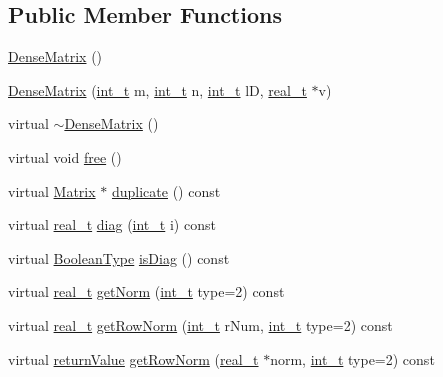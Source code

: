 \subsection*{Public Member Functions}
\begin{DoxyCompactItemize}
\item 
\hyperlink{class_dense_matrix_a962f1cca43a07753de96c8b9e413db06}{Dense\+Matrix} ()
\item 
\hyperlink{class_dense_matrix_ac3f86ff10526b05dc36e508002fede15}{Dense\+Matrix} (\hyperlink{_types_8hpp_ab6fd6105e64ed14a0c9281326f05e623}{int\+\_\+t} m, \hyperlink{_types_8hpp_ab6fd6105e64ed14a0c9281326f05e623}{int\+\_\+t} n, \hyperlink{_types_8hpp_ab6fd6105e64ed14a0c9281326f05e623}{int\+\_\+t} lD, \hyperlink{qp_o_a_s_e_s__wrapper_8h_a0d00e2b3dfadee81331bbb39068570c4}{real\+\_\+t} $\ast$v)
\item 
virtual \hyperlink{class_dense_matrix_a7c920f60470d6a862624c7632fec5e4b}{$\sim$\+Dense\+Matrix} ()
\item 
virtual void \hyperlink{class_dense_matrix_acce63266bde8d6fd4a6c31a78c5e49e8}{free} ()
\item 
virtual \hyperlink{class_matrix}{Matrix} $\ast$ \hyperlink{class_dense_matrix_ac3f9cdc908b1f74c1dac8c14d0a09e7e}{duplicate} () const
\item 
virtual \hyperlink{qp_o_a_s_e_s__wrapper_8h_a0d00e2b3dfadee81331bbb39068570c4}{real\+\_\+t} \hyperlink{class_dense_matrix_a16eea4106ac1875461f2e9fb4a8204f5}{diag} (\hyperlink{_types_8hpp_ab6fd6105e64ed14a0c9281326f05e623}{int\+\_\+t} i) const
\item 
virtual \hyperlink{_types_8hpp_a20f82124c82b6f5686a7fce454ef9089}{Boolean\+Type} \hyperlink{class_dense_matrix_ae627afd0fc9462e62530da8fae2f09aa}{is\+Diag} () const
\item 
virtual \hyperlink{qp_o_a_s_e_s__wrapper_8h_a0d00e2b3dfadee81331bbb39068570c4}{real\+\_\+t} \hyperlink{class_dense_matrix_a78b402d0548c6e90aec0afeb301381c6}{get\+Norm} (\hyperlink{_types_8hpp_ab6fd6105e64ed14a0c9281326f05e623}{int\+\_\+t} type=2) const
\item 
virtual \hyperlink{qp_o_a_s_e_s__wrapper_8h_a0d00e2b3dfadee81331bbb39068570c4}{real\+\_\+t} \hyperlink{class_dense_matrix_a980d8bf632c1080fd6f67f8dfac853cc}{get\+Row\+Norm} (\hyperlink{_types_8hpp_ab6fd6105e64ed14a0c9281326f05e623}{int\+\_\+t} r\+Num, \hyperlink{_types_8hpp_ab6fd6105e64ed14a0c9281326f05e623}{int\+\_\+t} type=2) const
\item 
virtual \hyperlink{_message_handling_8hpp_a81d556f613bfbabd0b1f9488c0fa865e}{return\+Value} \hyperlink{class_dense_matrix_a1d3faae6ae439acdb478a6ca8a67e776}{get\+Row\+Norm} (\hyperlink{qp_o_a_s_e_s__wrapper_8h_a0d00e2b3dfadee81331bbb39068570c4}{real\+\_\+t} $\ast$norm, \hyperlink{_types_8hpp_ab6fd6105e64ed14a0c9281326f05e623}{int\+\_\+t} type=2) const

\end{DoxyCompactItemize}
